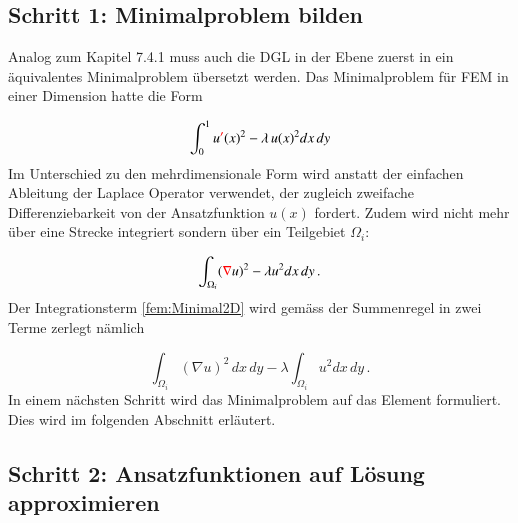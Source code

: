 \subsection{Schritt 1: Minimalproblem bilden}

Analog zum Kapitel 7.4.1 muss auch die DGL in der Ebene zuerst in ein äquivalentes Minimalproblem übersetzt werden. Das Minimalproblem für FEM in einer Dimension hatte die Form

\begin{equation}
			\int_0^1 u \textcolor{red}{'} (x)^2 - \lambda \, u(x)^2 dx \,dy
			\label{fem:Minimal1D}
\end{equation}
Im Unterschied zu den mehrdimensionale Form wird anstatt der einfachen Ableitung der Laplace Operator verwendet, der zugleich zweifache Differenziebarkeit von der Ansatzfunktion $u(x)$ fordert. Zudem wird nicht mehr über eine Strecke integriert sondern über ein Teilgebiet $\Omega_i$:

\begin{equation}
			\int_{\Omega_i} (\textcolor{red}{\nabla} u)^2 - \lambda u^2 dx \, dy \, .
			\label{fem:Minimal2D}
\end{equation}
Der Integrationsterm \eqref{fem:Minimal2D} wird gemäss der Summenregel in zwei Terme zerlegt nämlich 

\begin{equation}
			\int_{\Omega_i} (\nabla u)^2 \, dx \, dy - \lambda \int_{\Omega_i} u^2 dx \, dy \, .
			\label{fem:Minimal2D2Term}
\end{equation}
In einem nächsten Schritt wird das Minimalproblem auf das Element formuliert. Dies wird im folgenden Abschnitt erläutert.

\subsection{Schritt 2: Ansatzfunktionen auf Lösung approximieren}

